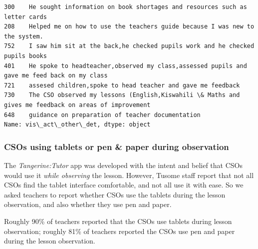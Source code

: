 \documentclass[11pt]{article}
\begin{document}
\begin{Verbatim}[commandchars=\\\{\}]
300    He sought information on book shortages and resources such as letter cards                                                                                                                       
208    Helped me on how to use the teachers guide because I was new to the system.                                                                                                                      
752    I saw him sit at the back,he checked pupils work and he checked pupils books                                                                                                                     
401    He spoke to headteacher,observed my class,assessed pupils and gave me feed back on my class                                                                                                      
721    assesed children,spoke to head teacher and gave me feedback                                                                                                                                      
730    The CSO observed my lessons (English,Kiswahili \& Maths and gives me feedback on areas of improvement                                                                                             
648    guidance on preparation of teacher documentation                                                                                                                                                 
Name: vis\_act\_other\_det, dtype: object

    \end{Verbatim}

    \hypertarget{csos-using-tablets-or-pen-paper-during-observation}{%
\subsubsection{CSOs using tablets or pen \& paper during
observation}\label{csos-using-tablets-or-pen-paper-during-observation}}

The \emph{Tangerine:Tutor} app was developed with the intent and belief
that CSOs would use it \emph{while observing} the lesson. However,
Tusome staff report that not all CSOs find the tablet interface
comfortable, and not all use it with ease. So we asked teachers to
report whether CSOs use the tablets during the lesson observation, and
also whether they use pen and paper.

    Roughly 90\% of teachers reported that the CSOs use tablets during
lesson observation; roughly 81\% of teachers reported the CSOs use pen
and paper during the lesson observation.
\end{document}
